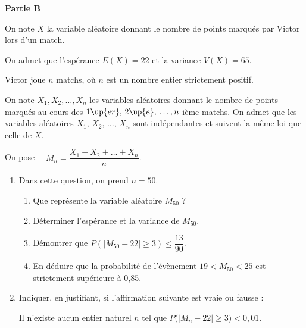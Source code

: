 \documentclass[10pt]{article}
\begin{document}
\medskip

\textbf{Partie B}

\medskip

On note $X$ la variable aléatoire donnant le nombre de points marqués par Victor lors d'un match.

\medskip

On admet que l'espérance $E(X) = 22$ et la variance $V(X) = 65$.

\medskip

Victor joue $n$ matchs, où $n$ est un nombre entier strictement positif.

On note $X_{1}, X_{2}, \ldots, X_{n}$ les variables aléatoires donnant le nombre de points marqués au cours des $1\up{er},\, 2\up{e},\, \ldots, n$-ième matchs. On admet que les variables aléatoires $X_{1},\, X_{2},\, \ldots,\, X_{n}$ sont indépendantes et suivent la même loi que celle de $X$.

\medskip

On pose $\quad M_{n}=\dfrac{X_{1} + X_{2} + \ldots + X_{n}}{n}$.

\medskip

\begin{enumerate}
\item Dans cette question, on prend $n = 50$.

	\begin{enumerate}
		\item Que représente la variable aléatoire $M_{50}$ ?
		\item Déterminer l'espérance et la variance de $M_{50}$.
		\item Démontrer que $P\left(\left|M_{50}-22\right| \geqslant 3\right) \leqslant \dfrac{13}{90}$.
		\item En déduire que la probabilité de l'évènement \og  $19<M_{50}<25$ \fg{}  est strictement supérieure à 0,85.
	\end{enumerate}
\item Indiquer, en justifiant, si l'affirmation suivante est vraie ou fausse :

	\og Il n'existe aucun entier naturel $n$ tel que $P\big(\left|M_{n}-22\right| \geqslant 3\big)< 0,01$\fg.
\end{enumerate}


\bigskip
\end{document}
